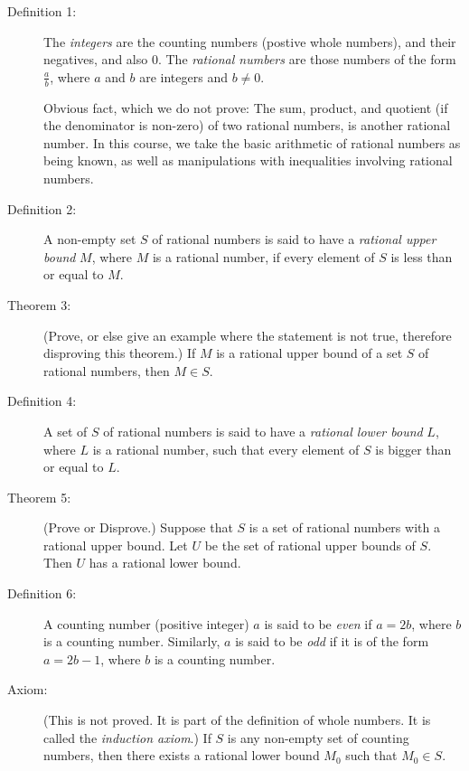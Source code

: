 \documentclass{article}
\begin{document}
\begin{description}

  \item[Definition 1:] The \emph{integers} are the counting numbers (postive whole numbers), and their negatives, and also $0$. The \emph{rational numbers} are those numbers of the form $\frac{a}{b}$, where $a$ and $b$ are integers and $b \neq 0$.

  \item[] Obvious fact, which we do not prove: The sum, product, and quotient (if the denominator is non-zero) of two rational numbers, is another rational number. In this course, we take the basic arithmetic of rational numbers as being known, as well as manipulations with inequalities involving rational numbers.

  \item[Definition 2:] A non-empty set $S$ of rational numbers is said to have a \emph{rational upper bound} $M$, where $M$ is a rational number, if every element of $S$ is less than or equal to $M$.

  \item[Theorem 3:] (Prove, or else give an example where the statement is not true, therefore disproving this theorem.) If $M$ is a rational upper bound of a set $S$ of rational numbers, then $M \in S$. 

  \item[Definition 4:] A set of $S$ of rational numbers is said to have a \emph{rational lower bound} $L$, where $L$ is a rational number, such that every element of $S$ is bigger than or equal to $L$.

  \item[Theorem 5:] (Prove or Disprove.) Suppose that $S$ is a set of rational numbers with a rational upper bound. Let $U$ be the set of rational upper bounds of $S$. Then $U$ has a rational lower bound.

  \item[Definition 6:] A counting number (positive integer) $a$ is said to be \emph{even} if $a = 2b$, where $b$ is a counting number. Similarly, $a$ is said to be \emph{odd} if it is of the form $a = 2b-1$, where $b$ is a counting number.

  \item[Axiom:] (This is not proved. It is part of the definition of whole numbers. It is called the \emph{induction axiom}.) If $S$ is any non-empty set of counting numbers, then there exists a rational lower bound $M_{0}$ such that $M_{0} \in S$.


\end{description}
\end{document}

